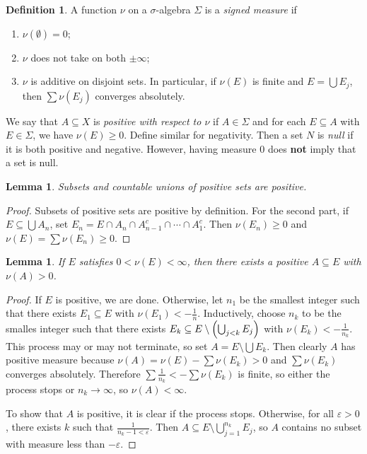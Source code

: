 \documentclass[leqno, openany]{memoir}
\newtheorem{lem}[thm]{Lemma}
\theoremstyle{definition}
\newtheorem{defn}[thm]{Definition}
\theoremstyle{remark}
\theoremstyle{plain}
\theoremstyle{definition}
\theoremstyle{remark}
\newcommand{\ep}{\varepsilon}
\begin{document}
\begin{defn} A function $\nu$ on a $\sigma$-algebra $\Sigma$ is a
    \textit{signed measure} if \begin{enumerate} \item $\nu(\emptyset) = 0$;
        \item $\nu$ does not take on both $\pm \infty$; \item $\nu$ is additive
            on disjoint sets. In particular, if $\nu(E)$ is finite and $E =
            \bigcup E_j$, then $\sum \nu(E_j)$ converges absolutely.
    \end{enumerate} \end{defn}

We say that $A \subseteq X$ is \textit{positive with respect to $\nu$} if $A
\in \Sigma$ and for each $E \subseteq A$ with $E \in \Sigma$, we have $\nu(E)
\geq 0$. Define similar for negativity. Then a set $N$ is \textit{null} if it
is both positive and negative. However, having measure $0$ does \textbf{not}
imply that a set is null.

\begin{lem} Subsets and countable unions of positive sets are positive.
\end{lem}

\begin{proof} Subsets of positive sets are positive by definition. For the
    second part, if $E \subseteq \bigcup A_n$, set $E_n = E \cap A_n \cap
    A_{n-1}^c \cap  \cdots \cap A_1^c$. Then $\nu(E_n) \geq 0$ and $\nu(E) =
    \sum \nu(E_n) \geq 0$.  \end{proof}

\begin{lem} If $E$ satisfies $0 < \nu(E) < \infty$, then there exists a
positive $A \subseteq E$ with $\nu(A) > 0$.  \end{lem}

\begin{proof} If $E$ is positive, we are done. Otherwise, let $n_1$ be the
    smallest integer such that there exists $E_1 \subseteq E$ with $\nu(E_1) <
    - \frac{1}{n}$. Inductively, choose $n_k$ to be the smalles integer such
    that there exists $E_k \subseteq E \setminus \qty(\bigcup_{j<k} E_j)$ with
    $\nu(E_k) < - \frac{1}{n_k}$. This process may or may not terminate, so set
    $A = E \setminus \bigcup E_k$. Then clearly $A$ has positive measure
    because $\nu(A) = \nu(E) - \sum \nu(E_k) > 0$ and $\sum \nu(E_k)$ converges
    absolutely. Therefore $\sum \frac{1}{n_k} < - \sum \nu(E_k)$ is finite, so
    either the process stops or $n_k \to \infty$, so $\nu(A) < \infty$. 

    To show that $A$ is positive, it is clear if the process stops. Otherwise,
for all $\ep > 0$, there exists $k$ such that $\frac{1}{n_{k} - 1 < \ep}$. Then
$A \subseteq E \setminus \bigcup_{j=1}^{n_k} E_j$, so $A$ contains no subset
with measure less than $- \ep$.  \end{proof}
\end{document}

